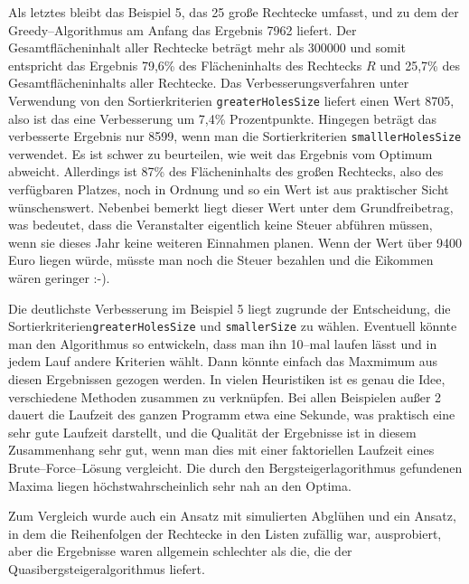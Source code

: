 Als letztes bleibt das Beispiel 5, das 25 große Rechtecke umfasst, und zu dem 
der Greedy--Algorithmus am Anfang das Ergebnis 7962 liefert. 
Der Gesamtflächeninhalt aller Rechtecke beträgt mehr als 300000 und somit
entspricht das Ergebnis 79,6\% des Flächeninhalts des Rechtecks $R$ und
25,7\% des Gesamtflächeninhalts aller Rechtecke.
Das Verbesserungsverfahren unter Verwendung von den Sortierkriterien \texttt{greaterHolesSize}
liefert einen Wert 8705, also ist das eine Verbesserung um 7,4\% Prozentpunkte.
Hingegen beträgt das verbesserte Ergebnis nur 8599, wenn man 
die Sortierkriterien \texttt{smalllerHolesSize} verwendet. 
Es ist schwer zu beurteilen, wie weit das Ergebnis vom Optimum abweicht. 
Allerdings ist 87\% des Flächeninhalts des großen Rechtecks, also des verfügbaren Platzes,
noch in Ordnung und so ein Wert ist aus praktischer Sicht wünschenswert. 
Nebenbei bemerkt liegt dieser Wert unter dem Grundfreibetrag, was bedeutet, dass
die Veranstalter eigentlich keine Steuer abführen müssen,
wenn sie dieses Jahr keine weiteren Einnahmen planen. 
Wenn der Wert über 9400 Euro liegen würde, müsste man noch die 
Steuer bezahlen und die Eikommen wären geringer :-).

Die deutlichste Verbesserung im Beispiel 5 liegt zugrunde der Entscheidung,
die Sortierkriterien\break \texttt{greaterHolesSize} und \texttt{smallerSize} zu wählen.
Eventuell könnte man den Algorithmus so entwickeln, dass man ihn 10--mal laufen lässt
und in jedem Lauf andere Kriterien wählt. Dann könnte einfach das Maxmimum aus 
diesen Ergebnissen gezogen werden. In vielen Heuristiken ist es genau die Idee, verschiedene Methoden
zusammen zu verknüpfen.
Bei allen Beispielen außer 2 dauert die Laufzeit des ganzen Programm etwa eine Sekunde,
was praktisch eine sehr gute Laufzeit darstellt, und die Qualität der Ergebnisse 
ist in diesem Zusammenhang sehr gut, wenn man dies mit einer faktoriellen Laufzeit 
eines Brute--Force--Lösung vergleicht. Die durch den Bergsteigerlagorithmus 
gefundenen Maxima liegen höchstwahrscheinlich sehr nah an den Optima.

Zum Vergleich wurde auch ein Ansatz mit simulierten Abglühen und ein Ansatz, in
dem die Reihenfolgen der Rechtecke in den Listen zufällig war, ausprobiert, aber
die Ergebnisse waren allgemein schlechter als die, die der Quasibergsteigeralgorithmus liefert.